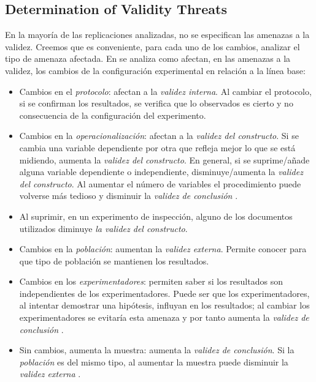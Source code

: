 \subsection{Determination of Validity Threats}

En la mayoría de las replicaciones analizadas, no se especifican las amenazas a la validez. Creemos que es conveniente, para cada uno de los cambios, analizar el tipo de amenaza afectada. 
En \cite{gomez2014understanding} se analiza como afectan, en las amenazas a la validez, los cambios de la configuración experimental en relación a la línea base:

\begin{itemize}
    \item Cambios en el \textit{protocolo}: afectan a la \textit{validez interna}. Al cambiar el protocolo, si se confirman los resultados, se verifica que lo observados es cierto y no consecuencia de la configuración del experimento.
    
    \item Cambios en la \textit{operacionalización}: afectan a la \textit{validez del constructo}. Si se cambia una variable dependiente por otra que refleja mejor lo que se está midiendo, aumenta la \textit{validez del constructo}. En general, si se suprime/añade alguna variable dependiente o independiente, disminuye/aumenta la \textit{validez del constructo}. Al aumentar el número de variables el procedimiento puede volverse más tedioso y disminuir la \textit{validez de conclusión} \cite{wohlin:experimentation}.

 \item Al suprimir, en un experimento de inspección, alguno de los documentos utilizados diminuye \textit{la validez del constructo}. %
    
     \item Cambios en la \textit{población}: aumentan la \textit{validez externa}. Permite conocer para que tipo de población se mantienen los resultados.
     
      \item Cambios en los \textit{experimentadores}: permiten saber si los resultados son independientes de los experimentadores. Puede ser que los experimentadores, al intentar demostrar una hipótesis, influyan en los resultados; al cambiar los experimentadores se evitaría esta amenaza y por tanto aumenta la \textit{validez de conclusión} \cite{wohlin:experimentation}.
    
    \item Sin cambios, aumenta la muestra: aumenta la \textit{validez de conclusión}. Si la \textit{población} es del mismo tipo, al aumentar la muestra puede disminuir la \textit{validez externa} \cite{wohlin:experimentation}. 
\end{itemize}
